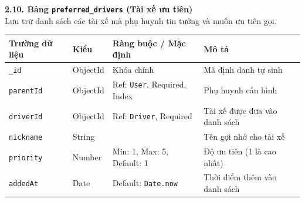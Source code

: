 \documentclass[../DoAn.tex]{subfiles}
\begin{document}
\textbf{2.10. Bảng \texttt{preferred\_drivers} (Tài xế ưu tiên)} \\
Lưu trữ danh sách các tài xế mà phụ huynh tin tưởng và muốn ưu tiên gọi.
\begin{table}[H]
    \centering
    \begin{tabular}{|l|l|p{4cm}|p{5cm}|}
        \hline
        \textbf{Trường dữ liệu} & \textbf{Kiểu} & \textbf{Ràng buộc / Mặc định}       & \textbf{Mô tả}                \\ \hline
        \texttt{\_id}           & ObjectId      & Khóa chính                          & Mã định danh tự sinh          \\ \hline
        \texttt{parentId}       & ObjectId      & Ref: \texttt{User}, Required, Index & Phụ huynh cấu hình            \\ \hline
        \texttt{driverId}       & ObjectId      & Ref: \texttt{Driver}, Required      & Tài xế được đưa vào danh sách \\ \hline
        \texttt{nickname}       & String        &                                     & Tên gợi nhớ cho tài xế        \\ \hline
        \texttt{priority}       & Number        & Min: 1, Max: 5, Default: 1          & Độ ưu tiên (1 là cao nhất)    \\ \hline
        \texttt{addedAt}        & Date          & Default: \texttt{Date.now}          & Thời điểm thêm vào danh sách  \\ \hline
    \end{tabular}
\end{table}
\end{document}
